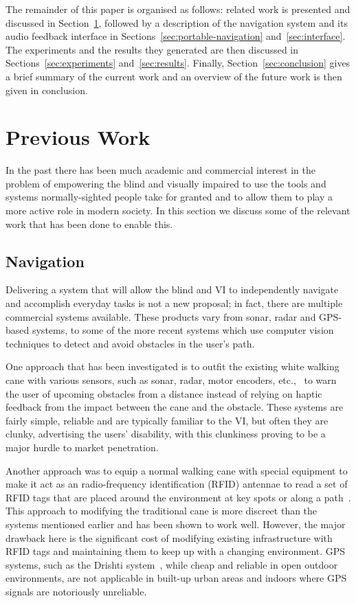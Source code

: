 \documentclass[format=sigconf, review=true, screen=true, anonymous=true]{acmart}
\begin{document}
The remainder of this paper is organised as follows: related work is presented and discussed in Section~\ref{sec:lit-review}, followed by a description of the navigation system and its audio feedback interface in Sections~\ref{sec:portable-navigation} and~\ref{sec:interface}. The experiments and the results they generated are then discussed in Sections~\ref{sec:experiments} and~\ref{sec:results}. Finally, Section~\ref{sec:conclusion} gives a brief summary of the current work and an overview of the future work is then given in conclusion. 

\section{Previous Work}
\label{sec:lit-review}

In the past there has been much academic and commercial interest in the problem of empowering the blind and visually impaired to use the tools and systems normally-sighted people take for granted and to allow them to play a more active role in modern society. In this section we discuss some of the relevant work that has been done to enable this. 

\subsection{Navigation}

Delivering a system that will allow the blind and VI to independently navigate and accomplish everyday tasks is not a new proposal; in fact, there are multiple commercial systems available. These products vary from sonar, radar and GPS-based systems, to some of the more recent systems which use computer vision techniques to detect and avoid obstacles in the user's path. 

One approach that has been investigated is to outfit the existing white walking cane with various sensors, such as sonar, radar, motor encoders, etc.,~\cite{ulrich1997, marion2008batcane} to warn the user of upcoming obstacles from a distance instead of relying on haptic feedback from the impact between the cane and the obstacle. These systems are fairly simple, reliable and are typically familiar to the VI, but often they are clunky, advertising the users' disability, with this clunkiness proving to be a major hurdle to market penetration. 

Another approach was to equip a normal walking cane with special equipment to make it act as an radio-frequency identification (RFID) antennae to read a set of RFID tags that are placed around the environment at key spots or along a path~\cite{faria2010electronic, willis2005}. This approach to modifying the traditional cane is more discreet than the systems mentioned earlier and has been shown to work well. However, the major drawback here is the significant cost of modifying existing infrastructure with RFID tags and maintaining them to keep up with a changing environment. GPS systems, such as the Drishti system~\cite{ran2004drishti}, while cheap and reliable in open outdoor environments, are not applicable in built-up urban areas and indoors where GPS signals are notoriously unreliable. 
\end{document}
